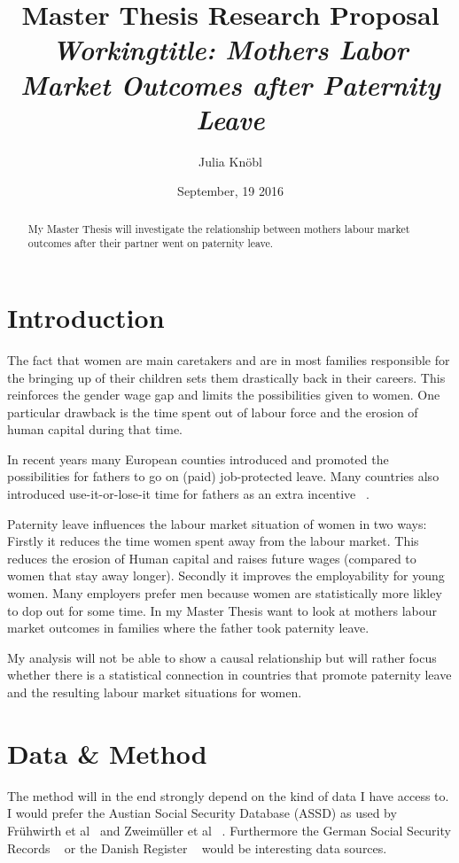\documentclass[notitlepage]{report}
\author{Julia Knöbl}
\date{September, 19 2016}
\title{Master Thesis Research Proposal \newline \textit{Workingtitle: Mothers Labor Market Outcomes after Paternity Leave}}
\begin{document}
\thispagestyle{empty}
\maketitle
\begin{abstract}
My Master Thesis will investigate the relationship between mothers labour market outcomes after their partner went on paternity leave.
\end{abstract}
\section*{Introduction}
\par The fact that women are main caretakers  and are in most families responsible for the bringing up of their children sets them drastically back in their careers. This reinforces the gender wage gap and limits the possibilities given to women. One particular drawback is the time spent out of labour force and the erosion of human capital during that time. 
\par In recent years many European counties introduced and promoted the possibilities for fathers to go on (paid) job-protected leave. Many countries also introduced use-it-or-lose-it time for fathers as an extra incentive ~\cite{ray2010cares}.
\par Paternity leave influences the labour market situation of women in two ways: Firstly it reduces the time women spent away from the labour market. This reduces the erosion of Human capital and raises future wages (compared to women that stay away longer). Secondly it improves the employability for young women. Many employers prefer men because women are statistically more likley to dop out for some time.  In my Master Thesis want to look at mothers labour market outcomes in families where the father took paternity leave.
\par My analysis will not be able to show a causal relationship but will rather focus whether there is a statistical connection in countries that promote paternity leave and the resulting labour market situations for women.
\section*{Data \& Method}
\par The method will in the end strongly depend on the kind of data I have access to. I would prefer the Austian Social Security Database (ASSD) as used by Frühwirth et al~\citeyear{fruhwirth2015mothers} and Zweimüller et al ~\citeyear{zweimuller2009austrian}. Furthermore the German Social Security Records ~\cite{schonberg2014expansions} or the Danish Register ~\cite{simonsen2006costs} would be interesting data sources.
 
\end{document}
